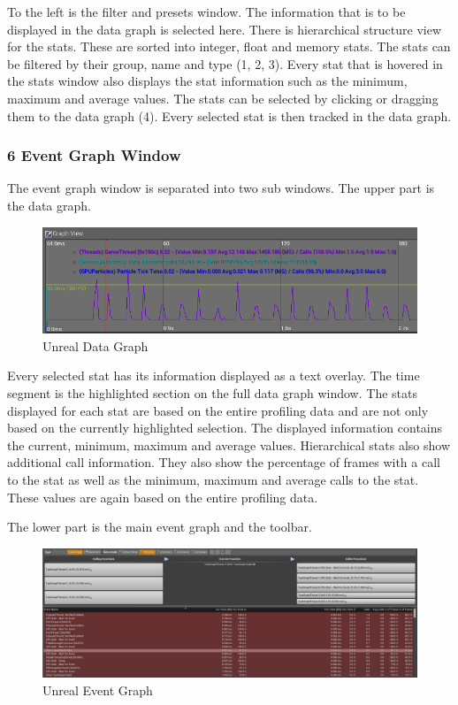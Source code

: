 To the left is the filter and presets window. The information that is to be displayed in the data graph is selected here. There is hierarchical structure view for the stats. These are sorted into integer, float and memory stats.
The stats can be filtered by their group, name and type (1, 2, 3). Every stat that is hovered in the stats window also displays the stat information such as the minimum, maximum and average values. The stats can be selected by clicking or dragging them to the data graph (4). Every selected stat is then tracked in the data graph.
\citep{unreal_profiler}

\subsubsection{6 Event Graph Window}

The event graph window is separated into two sub windows. The upper part is the data graph.

\begin{figure}[htbp]
\includegraphics[scale = 0.39]{img/Unreal_DataGraph.PNG}
\caption{Unreal Data Graph}
\label{fig:UnrealDataGraph}
\end{figure}

Every selected stat has its information displayed as a text overlay. The time segment is the highlighted section on the full data graph window. The stats displayed for each stat are based on the entire profiling data and are not only based on the currently highlighted selection. The displayed information contains the current, minimum, maximum and average values. Hierarchical stats also show additional call information. They also show the percentage of frames with a call to the stat as well as the minimum, maximum and average calls to the stat. These values are again based on the entire profiling data.
\citep{unreal_profiler}

The lower part is the main event graph and the toolbar.

\begin{figure}[htbp]
\includegraphics[scale = 0.18]{img/Unreal_EventGraph.PNG}
\caption{Unreal Event Graph}
\label{fig:UnrealEventGraph}
\end{figure}

